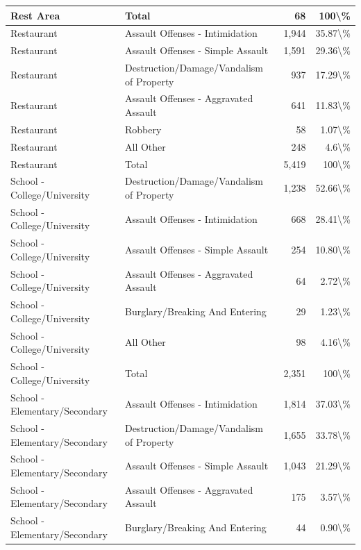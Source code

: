 \documentclass[
]{krantz}
\begin{document}
\begin{longtable}[t]{l|l|r|r}
\hline
Rest Area & Total & 68 & 100\textbackslash{}\%\\
\hline
Restaurant & Assault Offenses - Intimidation & 1,944 & 35.87\textbackslash{}\%\\
\hline
Restaurant & Assault Offenses - Simple Assault & 1,591 & 29.36\textbackslash{}\%\\
\hline
Restaurant & Destruction/Damage/Vandalism of Property & 937 & 17.29\textbackslash{}\%\\
\hline
Restaurant & Assault Offenses - Aggravated Assault & 641 & 11.83\textbackslash{}\%\\
\hline
Restaurant & Robbery & 58 & 1.07\textbackslash{}\%\\
\hline
Restaurant & All Other & 248 & 4.6\textbackslash{}\%\\
\hline
Restaurant & Total & 5,419 & 100\textbackslash{}\%\\
\hline
School - College/University & Destruction/Damage/Vandalism of Property & 1,238 & 52.66\textbackslash{}\%\\
\hline
School - College/University & Assault Offenses - Intimidation & 668 & 28.41\textbackslash{}\%\\
\hline
School - College/University & Assault Offenses - Simple Assault & 254 & 10.80\textbackslash{}\%\\
\hline
School - College/University & Assault Offenses - Aggravated Assault & 64 & 2.72\textbackslash{}\%\\
\hline
School - College/University & Burglary/Breaking And Entering & 29 & 1.23\textbackslash{}\%\\
\hline
School - College/University & All Other & 98 & 4.16\textbackslash{}\%\\
\hline
School - College/University & Total & 2,351 & 100\textbackslash{}\%\\
\hline
School - Elementary/Secondary & Assault Offenses - Intimidation & 1,814 & 37.03\textbackslash{}\%\\
\hline
School - Elementary/Secondary & Destruction/Damage/Vandalism of Property & 1,655 & 33.78\textbackslash{}\%\\
\hline
School - Elementary/Secondary & Assault Offenses - Simple Assault & 1,043 & 21.29\textbackslash{}\%\\
\hline
School - Elementary/Secondary & Assault Offenses - Aggravated Assault & 175 & 3.57\textbackslash{}\%\\
\hline
School - Elementary/Secondary & Burglary/Breaking And Entering & 44 & 0.90\textbackslash{}\%\\

\end{longtable}
\end{document}
